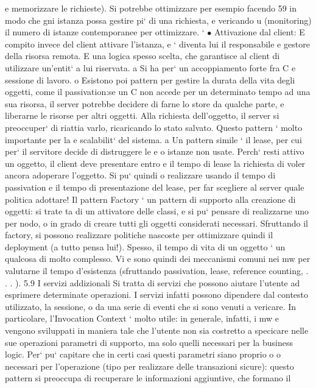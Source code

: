 \documentclass[a4paper,12pt]{article}
\begin{document}
e
memorizzare le richieste). Si potrebbe ottimizzare per esempio facendo
59
\newpage
in modo che gni istanza possa gestire pi` di una richiesta, e vericando
u
(monitoring) il numero di istanze contemporanee per ottimizzare.
`
$\bullet$ Attivazione dal client: E compito invece del client attivare l'istanza, e
`
diventa lui il responsabile e gestore della risorsa remota. E una logica
spesso scelta, che garantisce al client di utilizzare un'entit` a lui riservata.
a
Si ha per` un accoppiamento forte fra C e sessione di lavoro.
o
Esistono poi pattern per gestire la durata della vita degli oggetti, come il passivation:se un C non accede per un
determinato tempo ad una sua risorsa, il
server potrebbe decidere di farne lo store da qualche parte, e liberarne le risorse
per altri oggetti. Alla richiesta dell'oggetto, il server si preoccuper` di riattia
varlo, ricaricando lo stato salvato. Questo pattern ` molto importante per la
e
scalabilit` del sistema.
a
Un pattern simile ` il lease, per cui per` il servitore decide di distruggere le
e
o
istanze non usate. Perch` resti attivo un oggetto, il client deve presentare entro
e
il tempo di lease la richiesta di voler ancora adoperare l'oggetto. Si pu` quindi
o
realizzare usando il tempo di passivation e il tempo di presentazione del lease,
per far scegliere al server quale politica adottare!
Il pattern Factory ` un pattern di supporto alla creazione di oggetti: si trate
ta di un attivatore delle classi, e si pu` pensare di realizzarne uno per nodo,
o
in grado di creare tutti gli oggetti considerati necessari. Sfruttando il factory,
si possono realizzare politiche nascoste per ottimizzare quindi il deployment (a
tutto pensa lui!).
Spesso, il tempo di vita di un oggetto ` un qualcosa di molto complesso. Vi
e
sono quindi dei meccanismi comuni nei mw per valutarne il tempo d'esistenza
(sfruttando passivation, lease, reference counting, . . . ).
5.9
I servizi addizionali
Si tratta di servizi che possono aiutare l'utente ad esprimere determinate operazioni. I servizi infatti possono
dipendere dal contesto utilizzato, la sessione, o
da una serie di eventi che si sono venuti a vericare.
In particolare, l'Invocation Context ` molto utile: in generale, infatti, i mw
e
vengono sviluppati in maniera tale che l'utente non sia costretto a specicare
nelle sue operazioni parametri di supporto, ma solo quelli necessari per la business logic. Per` pu` capitare che in
certi casi questi parametri siano proprio
o
o
necessari per l'operazione (tipo per realizzare delle transazioni sicure): questo
pattern si preoccupa di recuperare le informazioni aggiuntive, che formano il
\end{document}
